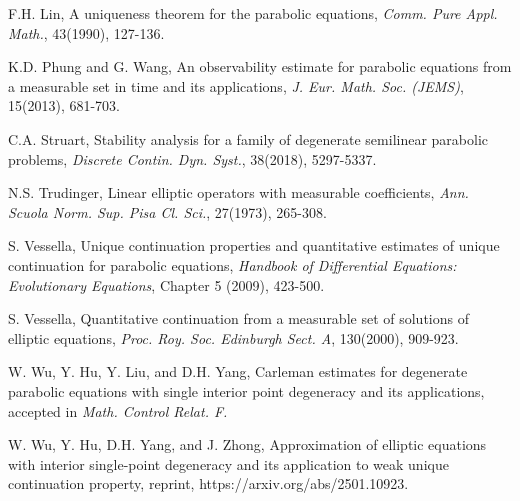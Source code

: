 \documentclass[11pt]{article}
\numberwithin{equation}{section}
\begin{document}
\begin{thebibliography}{}
	F.H. Lin, A uniqueness theorem for the parabolic equations,
	{\it  Comm. Pure Appl. Math.}, 43(1990), 127-136.
	
	K.D. Phung and G. Wang, An observability estimate for parabolic equations from a measurable set in time and its applications, {\it  J. Eur. Math. Soc. (JEMS)}, 15(2013), 681-703.
	
	
	
	C.A. Struart, Stability analysis for a family of degenerate semilinear parabolic problems, {\it  Discrete Contin. Dyn. Syst.}, 38(2018), 5297-5337.
	
	N.S. Trudinger, Linear elliptic operators with measurable coefficients, {\it  Ann. Scuola Norm. Sup. Pisa Cl. Sci.}, 27(1973), 265-308.
	
	S. Vessella, Unique continuation properties and quantitative estimates of unique continuation for parabolic equations, {\it Handbook of Differential Equations: Evolutionary Equations}, Chapter 5 (2009), 423-500.
	
	S. Vessella, Quantitative continuation from a measurable set of solutions of elliptic equations,
	{\it  Proc. Roy. Soc. Edinburgh Sect. A}, 130(2000), 909-923.
	
	W. Wu, Y. Hu, Y. Liu, and D.H. Yang, Carleman estimates for degenerate parabolic equations with single interior point degeneracy and its applications, accepted in {\it Math. Control Relat. F.}



	
	W. Wu, Y. Hu, D.H. Yang, and J. Zhong, Approximation of elliptic equations with interior single-point degeneracy and its application to
weak unique continuation property, reprint, https://arxiv.org/abs/2501.10923.
	
	
	
	
	
	
	
	
	
	
	
	
	
	
	
	
	
	
	
	
	
	
	
	
	
	
	
	
	
	
	
	
	
\end{thebibliography}
	
	
\end{document}
